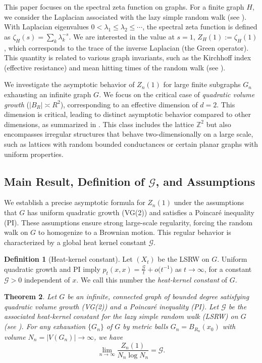 \documentclass[12pt]{amsart}
\newtheorem{theorem}{Theorem}[section]
\theoremstyle{definition}
\newtheorem{definition}[theorem]{Definition}
\theoremstyle{remark}
\newcommand{\cG}{\mathcal{G}}    %
\begin{document}
This paper focuses on the spectral zeta function on graphs. For a finite graph $H$, we consider the Laplacian associated with the lazy simple random walk (see ). With Laplacian eigenvalues $0 < \lambda_1 \leq \lambda_2 \leq \cdots$, the spectral zeta function is defined as $\zeta_H(s) = \sum_k \lambda_k^{-s}$. We are interested in the value at $s=1$, $Z_H(1) := \zeta_H(1)$, which corresponds to the trace of the inverse Laplacian (the Green operator). This quantity is related to various graph invariants, such as the Kirchhoff index (effective resistance) and mean hitting times of the random walk (see \cite{LyonsPeres16}).

We investigate the asymptotic behavior of $Z_n(1)$ for large finite subgraphs $G_n$ exhausting an infinite graph $G$. We focus on the critical case of \emph{quadratic volume growth} ($|B_R| \asymp R^2$), corresponding to an effective dimension of $d=2$. This dimension is critical, leading to distinct asymptotic behavior compared to other dimensions, as summarized in . This class includes the lattice $\mathbb{Z}^2$ but also encompasses irregular structures that behave two-dimensionally on a large scale, such as lattices with random bounded conductances or certain planar graphs with uniform properties.

\subsection{Main Result, Definition of $\cG$, and Assumptions}
We establish a precise asymptotic formula for $Z_n(1)$ under the assumptions that $G$ has uniform quadratic growth (VG(2)) and satisfies a Poincaré inequality (PI). These assumptions ensure strong large-scale regularity, forcing the random walk on $G$ to homogenize to a Brownian motion. This regular behavior is characterized by a global heat kernel constant $\cG$.

\begin{definition}[Heat-kernel constant]\label{def:G}
Let $(X_t)$ be the LSRW on $G$. Uniform quadratic growth and PI imply
\(
    p_t(x,x)=\frac{\cG}{t}+o\!\bigl(t^{-1}\bigr)
\)
as $t\to\infty$, for a constant $\cG>0$ independent of $x$. We call this number the \emph{heat-kernel constant} of $G$.
\end{definition}

\begin{theorem}\label{thm:main}
Let $G$ be an infinite, connected graph of bounded degree satisfying quadratic volume growth (VG(2)) and a Poincaré inequality (PI). Let $\cG$ be the associated heat-kernel constant for the lazy simple random walk (LSRW) on $G$ (see ). For any exhaustion $\{G_n\}$ of $G$ by metric balls $G_n = B_{R_n}(x_0)$ with volume $N_n = |V(G_n)| \to \infty$, we have
\[
\lim_{n \to \infty} \frac{Z_n(1)}{N_n \log N_n} = \cG.
\]
\end{theorem}
\end{document}

